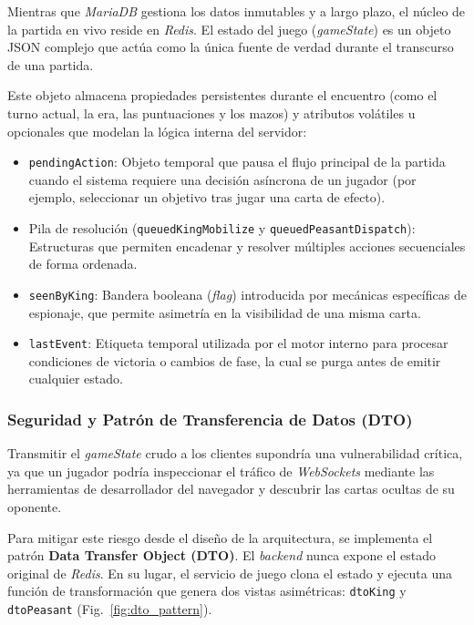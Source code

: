 Mientras que \textit{MariaDB} gestiona los datos inmutables y a largo plazo, el núcleo de la partida en vivo reside en \textit{Redis}. El estado del juego (\textit{gameState}) es un objeto JSON complejo que actúa como la única fuente de verdad durante el transcurso de una partida.

Este objeto almacena propiedades persistentes durante el encuentro (como el turno actual, la era, las puntuaciones y los mazos) y atributos volátiles u opcionales que modelan la lógica interna del servidor:
\begin{itemize}
    \item \texttt{pendingAction}: Objeto temporal que pausa el flujo principal de la partida cuando el sistema requiere una decisión asíncrona de un jugador (por ejemplo, seleccionar un objetivo tras jugar una carta de efecto).
    \item Pila de resolución (\texttt{queuedKingMobilize} y \texttt{queuedPeasantDispatch}): Estructuras que permiten encadenar y resolver múltiples acciones secuenciales de forma ordenada.
    \item \texttt{seenByKing}: Bandera booleana (\textit{flag}) introducida por mecánicas específicas de espionaje, que permite asimetría en la visibilidad de una misma carta.
    \item \texttt{lastEvent}: Etiqueta temporal utilizada por el motor interno para procesar condiciones de victoria o cambios de fase, la cual se purga antes de emitir cualquier estado.
\end{itemize}

\subsubsection{Seguridad y Patrón de Transferencia de Datos (DTO)}

Transmitir el \textit{gameState} crudo a los clientes supondría una vulnerabilidad crítica, ya que un jugador podría inspeccionar el tráfico de \textit{WebSockets} mediante las herramientas de desarrollador del navegador y descubrir las cartas ocultas de su oponente.

Para mitigar este riesgo desde el diseño de la arquitectura, se implementa el patrón \textbf{Data Transfer Object (DTO)}. El \textit{backend} nunca expone el estado original de \textit{Redis}. En su lugar, el servicio de juego clona el estado y ejecuta una función de transformación que genera dos vistas asimétricas: \texttt{dtoKing} y \texttt{dtoPeasant} (Fig.~\ref{fig:dto_pattern}).

